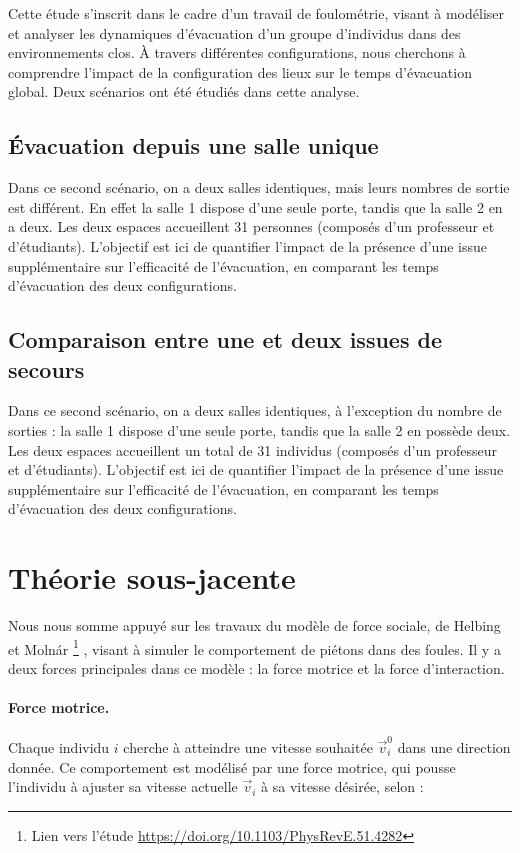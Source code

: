 \documentclass[a4paper,12pt]{article}
\begin{document}
Cette étude s’inscrit dans le cadre d’un travail de foulométrie, visant à modéliser et analyser les dynamiques d’évacuation d’un groupe d’individus dans des environnements clos. À travers différentes configurations, nous cherchons à comprendre l’impact de la configuration des lieux sur le temps d’évacuation global. Deux scénarios ont été étudiés dans cette analyse.

\subsection{Évacuation depuis une salle unique}

Dans ce second scénario, on a deux salles identiques, mais leurs nombres de sortie est différent. En effet la salle 1 dispose d’une seule porte, tandis que la salle 2 en a deux. Les deux espaces accueillent 31 personnes (composés d'un professeur et d'étudiants).
L’objectif est ici de quantifier l’impact de la présence d’une issue supplémentaire sur l’efficacité de l’évacuation, en comparant les temps d’évacuation des deux configurations.

\subsection{Comparaison entre une et deux issues de secours}

Dans ce second scénario, on a deux salles identiques, à l’exception du nombre de sorties : la salle 1 dispose d’une seule porte, tandis que la salle 2 en possède deux. Les deux espaces accueillent un total de 31 individus (composés d'un professeur et d'étudiants).
L’objectif est ici de quantifier l’impact de la présence d’une issue supplémentaire sur l’efficacité de l’évacuation, en comparant les temps d’évacuation des deux configurations.
\
\\
\section{Théorie sous-jacente}

Nous nous somme appuyé sur les travaux du modèle de force sociale, de Helbing et Molnár
\footnote{Lien vers l'étude \url{https://doi.org/10.1103/PhysRevE.51.4282}}
, visant à simuler le comportement de piétons dans des foules. Il y a deux forces principales dans ce modèle : la force motrice et la force d'interaction.

\paragraph{Force motrice.}
Chaque individu $i$ cherche à atteindre une vitesse souhaitée $\vec{v}_i^0$ dans une direction donnée. Ce comportement est modélisé par une force motrice, qui pousse l'individu à ajuster sa vitesse actuelle $\vec{v}_i$ à sa vitesse désirée, selon :
\end{document}
